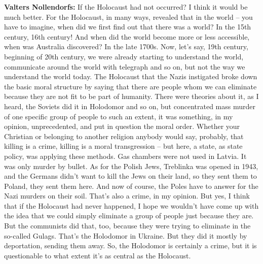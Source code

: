\textbf{Valters Nollendorfs:} If the Holocaust had not occurred? I think it would be much better. For the Holocaust, in many ways, revealed that in the world – you have to imagine, when did we first find out that there was a world? In the 15th century, 16th century! And when did the world become more or less accessible, when was Australia discovered? In the late 1700s. Now, let’s say, 19th century, beginning of 20th century, we were already starting to understand the world, communicate around the world with telegraph and so on, but not the way we understand the world today. The Holocaust that the Nazis instigated broke down the basic moral structure by saying that there are people whom we can eliminate because they are not fit to be part of humanity. There were theories about it, as I heard, the Soviets did it in Holodomor and so on, but concentrated mass murder of one specific group of people to such an extent, it was something, in my opinion, unprecedented, and put in question the moral order. Whether your Christian or belonging to another religion anybody would say, probably, that killing is a crime, killing is a moral transgression – but here, a state, as state policy, was applying these methods. Gas chambers were not used in Latvia. It was only murder by bullet. As for the Polish Jews, Treblinka was opened in 1943, and the Germans didn’t want to kill the Jews on their land, so they sent them to Poland, they sent them here. And now of course, the Poles have to answer for the Nazi murders on their soil. That’s also a crime, in my opinion. But yes, I think that if the Holocaust had never happened, I hope we wouldn’t have come up with the idea that we could simply eliminate a group of people just because they are. But the communists did that, too, because they were trying to eliminate in the so-called Gulags. That’s the Holodomor in Ukraine. But they did it mostly by deportation, sending them away. So, the Holodomor is certainly a crime, but it is questionable to what extent it’s as central as the Holocaust. 
